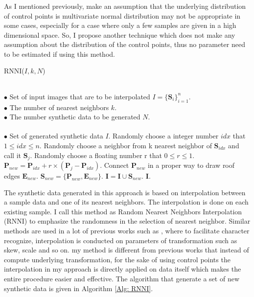 \documentclass{iitthesis}
\begin{document}
As I mentioned previously, make an assumption that the underlying distribution of control points is multivariate normal distribution may not be appropriate in some cases, especially for a case where only a few samples are given in a high dimensional space. So, I propose another technique which does not make any assumption about the distribution of the control points, thus no parameter need to be estimated if using this method. 

{\linespread{1.5}
\begin{algorithm}[htb]  
\small
 	\caption{ RNNI($I, k, N$)}   
	\label{Alg: RNNI}    
	\begin{algorithmic}[1]  		
	\REQUIRE ~~\\ 
		$\bullet$ Set of input images that are to be interpolated $I=\{\textbf{S}_i\}_{i=1}^n$. \\ 
		$\bullet$ The number of nearest neighbors $k$. \\ 	
		$\bullet$ The number synthetic data to be generated $N$. \\
	\ENSURE ~~\\
		$\bullet$ Set of generated synthetic data $I$. 	
	\STATE Randomly choose a integer number $idx$ that $1\leq idx \leq n$. 	
	\STATE Randomly choose a neighbor from k nearest neighbor of $\textbf{S}_{idx}$ and call it $\textbf{S}_j$.
	\STATE Randomly choose a floating number r that $0\leq r \leq 1$.	
	\STATE $\textbf{P}_{new}=\textbf{P}_{idx}+r\times(\textbf{P}_j-\textbf{P}_{idx})$.
	\STATE Connect $\textbf{P}_{new}$ in a proper way to draw roof edges $\textbf{E}_{new}$.
	\STATE $\textbf{S}_{new}=\{\textbf{P}_{new}, \textbf{E}_{new}\}$.
	\STATE $\textbf{I}=\textbf{I}\cup \textbf{S}_{new}$.
	\ENDFOR 	
	\RETURN \textbf{I}. 	
\end{algorithmic}   
\end{algorithm}  
}

The synthetic data generated in this approach is based on interpolation between a sample data and one of its nearest neighbors. The interpolation is done on each existing sample. I call this method as Random Nearest Neighbors Interpolation (RNNI) to emphasize the randomness in the selection of nearest neighbor. Similar methods are used in a lot of previous works such as \cite{Comput.Sci.&Appl.Math.1997}, where to facilitate character recognize, interpolation is conducted on parameters of transformation such as skew, scale and so on. my method is different from previous works that instead of compute underlying transformation, for the sake of using control points the interpolation in my approach is directly applied on data itself which makes the entire procedure easier and effective. The algorithm that generate a set of new synthetic data is given in Algorithm \ref{Alg: RNNI}.
\end{document}
